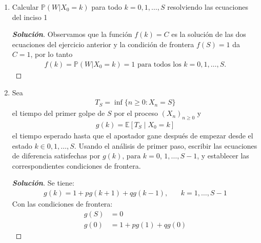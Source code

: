 \documentclass[12pt, letterpaper]{article}
\newcommand{\p}{\mathbb{P}}
\newenvironment{manualtheorem}[1]{%
  \renewcommand\themanualtheoreminner{#1}%
  \manualtheoreminner
}{\endmanualtheoreminner}
\newenvironment{solucion}
  {\renewcommand\qedsymbol{$\square$}\begin{proof}[\textbf{Solución}]}
  {\end{proof}}
\begin{document}
\begin{manualtheorem}{3.2}
\begin{enumerate}
        \item Calcular $\p(W | X_0 = k)$ para todo $k = 0, 1,\dots,S$ resolviendo las ecuaciones del inciso 1
        \begin{solucion}
            Observamos que la función $f(k) = C$ es la solución de las dos ecuaciones del ejercicio anterior y la condición de frontera $f(S)=1$ da $C=1$, por lo tanto
            \begin{align*}
                f(k) = \p(W | X_0 = k)=1\textrm{ para todos los } k = 0, 1,\dots,S.
            \end{align*}
        \end{solucion}
        
        \item Sea
        \begin{align*}
            T_S=\inf\{n\geq 0: X_n=S\}
        \end{align*}
        el tiempo del primer golpe de $S$ por el proceso $(X_n)_{n\geq0}$ y
        \begin{align*}
            g(k)=\mathbb{E}[T_S\mid X_0 = k]
        \end{align*}
        el tiempo esperado hasta que el apostador gane después de empezar desde el estado $k\in{0, 1, \dots, S}$. Usando el análisis de primer paso, escribir las ecuaciones de diferencia satisfechas por $g(k)\textrm{, para }k=0$, $1, \dots, S-1$, y establecer las correspondientes condiciones de frontera.
        \begin{solucion}
            Se tiene:
            \begin{align*}
                g(k)=1+pg(k+1)+qg(k-1)\textrm{, }& & k=1,\dots,S-1
            \end{align*}
            Con las condiciones de frontera:
            \begin{align*}
                g(S)&=0\\
                g(0)&=1+pg(1)+qg(0)
            \end{align*}
        \end{solucion}
        

\end{enumerate}
\end{manualtheorem}
\end{document}
